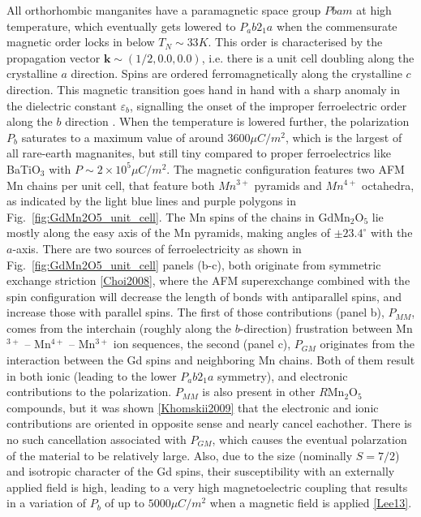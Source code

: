 All orthorhombic manganites have a paramagnetic space group $Pbam$ \cite{Alfonso97a} at high temperature, which eventually gets lowered to $P_ab2_1a$ when the commensurate magnetic order locks in below $T_{N} \sim 33K$.
This order is characterised by the propagation vector $\bm{k} \sim (1/2, 0.0, 0.0)$, i.e. there is a unit cell doubling along the crystalline $a$ direction. Spins are ordered ferromagnetically along the crystalline $c$ direction. This magnetic transition goes hand in hand with a sharp anomaly in the dielectric constant $\varepsilon_b$, signalling the onset of the improper ferroelectric order along the $b$ direction \cite{Lee13}.
When the temperature is lowered further, the polarization $P_b$ saturates to a maximum value of around $3600 \mu C/m^2$, which is the largest of all rare-earth magnanites, but still tiny compared to proper ferroelectrics like BaTiO$_3$ with $P \sim 2 \times 10^5 \mu C/m^2$.
The magnetic configuration features two AFM Mn chains per unit cell, that feature both $Mn^{3+}$ pyramids and $Mn^{4+}$ octahedra, as indicated by the light blue lines and purple polygons in Fig.~\ref{fig:GdMn2O5_unit_cell}. The Mn spins of the chains in GdMn$_2$O$_5$ lie mostly along the easy axis of the Mn pyramids, making angles of $\pm 23.4^\circ$ with the $a$-axis.
There are two sources of ferroelectricity as shown in Fig.~\ref{fig:GdMn2O5_unit_cell} panels (b-c), both originate from symmetric exchange striction \ref{Choi2008}, where the AFM superexchange combined with the spin configuration will decrease the length of bonds with antiparallel spins, and increase those with parallel spins. The first of those contributions (panel b), $P_{MM}$, comes from the interchain (roughly along the $b$-direction) frustration between Mn$^{3+}$ -- Mn$^{4+}$ -- Mn$^{3+}$ ion sequences, the second (panel c), $P_{GM}$ originates from the interaction between the Gd spins and neighboring Mn chains.
Both of them result in both ionic (leading to the lower $P_ab2_1a$ symmetry), and electronic contributions to the polarization.
$P_{MM}$ is also present in other $R$Mn$_2$O$_5$ compounds, but it was shown \ref{Khomskii2009} that the electronic and ionic contributions are oriented in opposite sense and nearly cancel eachother.
There is no such cancellation associated with $P_{GM}$, which causes the eventual polarzation of the material to be relatively large. Also, due to the size (nominally $S=7/2$) and isotropic character of the Gd spins, their susceptibility with an externally applied field is high, leading to a very high magnetoelectric coupling that results in a variation of $P_b$ of up to $5000 \mu C/m^2$ when a magnetic field is applied \ref{Lee13}. 

